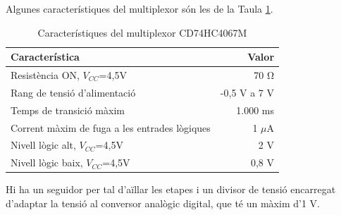 \noindent Algunes característiques del multiplexor són les de la Taula \ref{mux_ds}.
%
\begin{table}[H]
\small
\begin{center}
 \begin{tabular} {|l|r|}%
 \hline
 Característica & Valor \\
 \hline \hline 
Resistència ON, $V_{CC}$=4,5V & 70 \si\ohm \\ \hline
Rang de tensió d'alimentació & -0,5 V a 7 V \\ \hline
Temps de transició màxim & 1.000 ms \\ \hline
Corrent màxim de fuga a les entrades lògiques & 1 $\mu$A \\ \hline
Nivell lògic alt, $V_{CC}$=4,5V & 2 V \\ \hline
Nivell lògic baix, $V_{CC}$=4,5V & 0,8 V \\ \hline
 \end{tabular}
 \caption{Característiques del multiplexor CD74HC4067M}
 \label{mux_ds}
\end{center}
\end{table}



\noindent Hi ha un seguidor per tal d'aïllar les etapes i un divisor de tensió encarregat d'adaptar la tensió al conversor analògic digital, que té un màxim d'1 V. 



